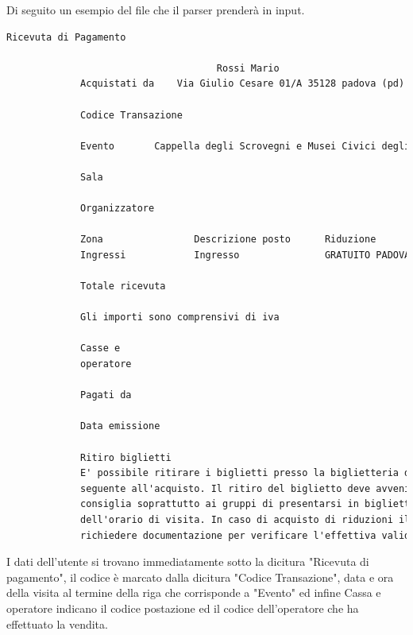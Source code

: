 Di seguito un esempio del file che il parser prenderà in input.
\lstset{frame=single}
\begin{center}
\begin{lstlisting}[language=TeX]
Ricevuta di Pagamento

                                     Rossi Mario
             Acquistati da    Via Giulio Cesare 01/A 35128 padova (pd) Italia
             
             Codice Transazione                                                      TLITE0528719557700
             
             Evento       Cappella degli Scrovegni e Musei Civici degli Eremitani del 14/05/2015 17:15 
             
             Sala                                                              Cappella degli Scrovegni
             
             Organizzatore                                                             Comune di Padova
             
             Zona                Descrizione posto      Riduzione             N.Bigl.  Prezzo  Prev.
             Ingressi            Ingresso               GRATUITO PADOVACARD     1    0,00   0,00
             
             Totale ricevuta                                                      1          0,00
             
             Gli importi sono comprensivi di iva
             
             Casse e                                                                         PC-01
             operatore                                                                        OperatoreX 
             
             Pagati da
             
             Data emissione                                                            30/01/2015 12:47
             
             Ritiro biglietti
             E' possibile ritirare i biglietti presso la biglietteria del museo a partire dal giorno
             seguente all'acquisto. Il ritiro del biglietto deve avvenire con congruo anticipo: si
             consiglia soprattutto ai gruppi di presentarsi in biglietteria almeno 45 minuti prima
             dell'orario di visita. In caso di acquisto di riduzioni il personale del museo potra'
             richiedere documentazione per verificare l'effettiva validita' dell'acquisto.


\end{lstlisting}
\end{center}
I dati dell'utente si trovano immediatamente sotto la dicitura "Ricevuta di pagamento", il codice \tlite è marcato dalla dicitura "Codice Transazione", data e ora della visita al termine della riga che corrisponde a "Evento" ed infine Cassa e operatore indicano il codice postazione ed il codice dell'operatore  che ha effettuato la vendita.

